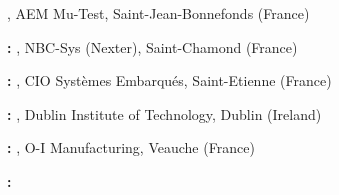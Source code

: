\begin{rubric}{}
%
	\textbf{}, AEM Mu-Test, Saint-Jean-Bonnefonds (France)\par
	\newline
	\textbf{:} 
\entry*[2020 -- 2021]%
	\textbf{}, NBC-Sys (Nexter), Saint-Chamond (France)\par
	\newline
	\textbf{:} 
\entry*[2020]%
	\textbf{}, CIO Systèmes Embarqués, Saint-Etienne (France)\par
	\newline
	\textbf{:} 
\entry*[2019]%
	\textbf{}, Dublin Institute of Technology, Dublin (Ireland)\par
	\newline
	\textbf{:} 
\entry*[2017]%
	\textbf{}, O-I Manufacturing, Veauche (France)\par
	\newline
	\textbf{:} 
\end{rubric}
